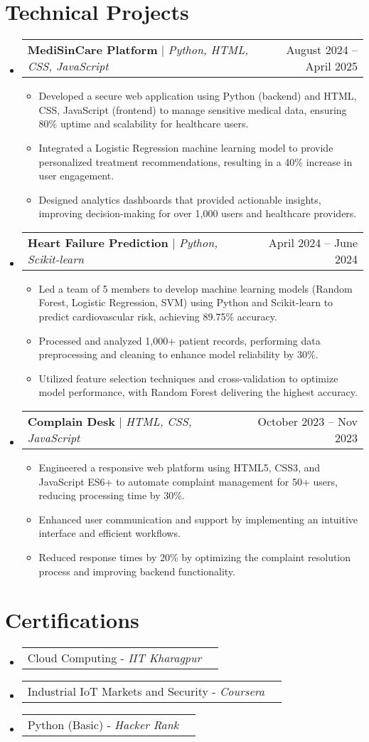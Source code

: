 \documentclass[letterpaper,10pt]{article}
\makeatletter
\newcommand{\resumeItem}[1]{
  \item\small{
    {#1 \vspace{-2pt}}
  }
}
\newcommand{\resumeProjectHeading}[2]{
    \item
    \begin{tabular*}{0.97\textwidth}{l@{\extracolsep{\fill}}r}
      \small#1 & #2 \\
    \end{tabular*}\vspace{-7pt}
}
\newcommand{\resumeSubHeadingListStart}{\begin{itemize}[leftmargin=0.15in, label={}]}
\newcommand{\resumeSubHeadingListEnd}{\end{itemize}}
\newcommand{\resumeItemListStart}{\begin{itemize}}
\newcommand{\resumeItemListEnd}{\end{itemize}\vspace{-5pt}}
\makeatother
\begin{document}
\section{Technical Projects}
\resumeSubHeadingListStart

\resumeProjectHeading
  {\textbf{MediSinCare Platform} $|$ \emph{Python, HTML, CSS, JavaScript}}{August 2024 – April 2025}
  \resumeItemListStart
    \resumeItem{Developed a secure web application using Python (backend) and HTML, CSS, JavaScript (frontend) to manage sensitive medical data, ensuring 80\% uptime and scalability for healthcare users.}
    \resumeItem{Integrated a Logistic Regression machine learning model to provide personalized treatment recommendations, resulting in a 40\% increase in user engagement.}
    \resumeItem{Designed analytics dashboards that provided actionable insights, improving decision-making for over 1,000 users and healthcare providers.}
  \resumeItemListEnd

\resumeProjectHeading
  {\textbf{Heart Failure Prediction} $|$ \emph{Python, Scikit-learn}}{April 2024 – June 2024}
  \resumeItemListStart
    \resumeItem{Led a team of 5 members to develop machine learning models (Random Forest, Logistic Regression, SVM) using Python and Scikit-learn to predict cardiovascular risk, achieving 89.75\% accuracy.}
    \resumeItem{Processed and analyzed 1,000+ patient records, performing data preprocessing and cleaning to enhance model reliability by 30\%.}
    \resumeItem{Utilized feature selection techniques and cross-validation to optimize model performance, with Random Forest delivering the highest accuracy.}
  \resumeItemListEnd

\resumeProjectHeading
  {\textbf{Complain Desk} $|$ \emph{HTML, CSS, JavaScript}}{October 2023 – Nov 2023}
  \resumeItemListStart
    \resumeItem{Engineered a responsive web platform using HTML5, CSS3, and JavaScript ES6+ to automate complaint management for 50+ users, reducing processing time by 30\%.}
    \resumeItem{Enhanced user communication and support by implementing an intuitive interface and efficient workflows.}
    \resumeItem{Reduced response times by 20\% by optimizing the complaint resolution process and improving backend functionality.}
  \resumeItemListEnd

\resumeSubHeadingListEnd

\section{Certifications}
\resumeSubHeadingListStart
  \resumeProjectHeading
    {{Cloud Computing} - \emph{IIT Kharagpur}}{}
  \resumeProjectHeading
    {{Industrial IoT Markets and Security} - \emph{Coursera}}{}
  \resumeProjectHeading
    {{Python (Basic)} - \emph{Hacker Rank }}{}
\resumeSubHeadingListEnd
\end{document}
